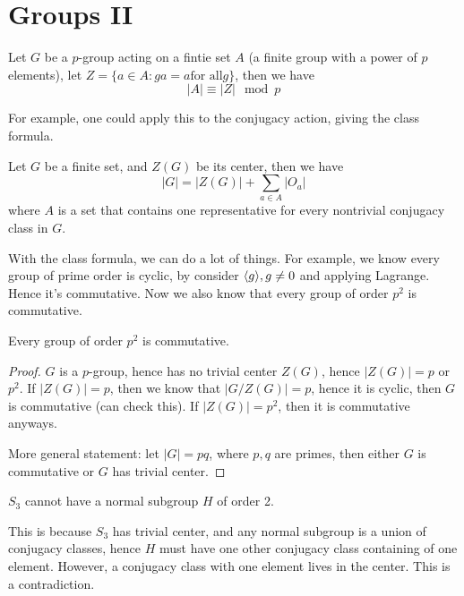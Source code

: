 \chapter{Groups II}

\begin{thm}
    Let $G$ be a $p$-group acting on a fintie set $A$ (a finite group with a power of $p$ elements), let $Z=\{a\in A: ga=a \text{for all} g\}$, then we have 
    \begin{equation*}
        |A|\equiv |Z| \mod p
    \end{equation*}
\end{thm}
For example, one could apply this to the conjugacy action, giving the class formula.
\begin{thm}
    Let $G$ be a finite set, and $Z(G)$ be its center, then we have
    \begin{equation*}
        |G|=|Z(G)|+\sum_{a\in A}|O_a|
    \end{equation*}
    where $A$ is a set that contains one representative for every nontrivial conjugacy class in $G$.
\end{thm}
With the class formula, we can do a lot of things. For example, we know every group of prime order is cyclic, by consider $\langle g\rangle, g\neq 0$ and applying Lagrange. Hence it's commutative. Now we also know that every group of order $p^2$ is commutative.
\begin{prop}
    Every group of order $p^2$ is commutative.
\end{prop}
\begin{proof}
    $G$ is a $p$-group, hence has no trivial center $Z(G)$, hence $|Z(G)|=p$ or $p^2$. If $|Z(G)|=p$, then we know that $|G/Z(G)|=p$, hence it is cyclic, then $G$ is commutative (can check this). If $|Z(G)|=p^2$, then it is commutative anyways.

    More general statement: let $|G|=pq$, where $p,q$ are primes, then either $G$ is commutative or $G$ has trivial center.
\end{proof}
\begin{example}
    $S_3$ cannot have a normal subgroup $H$ of order 2.

    This is because $S_3$ has trivial center, and any normal subgroup is a union of conjugacy classes, hence $H$ must have one other conjugacy class containing of one element. However, a conjugacy class with one element lives in the center. This is a contradiction.
\end{example}


